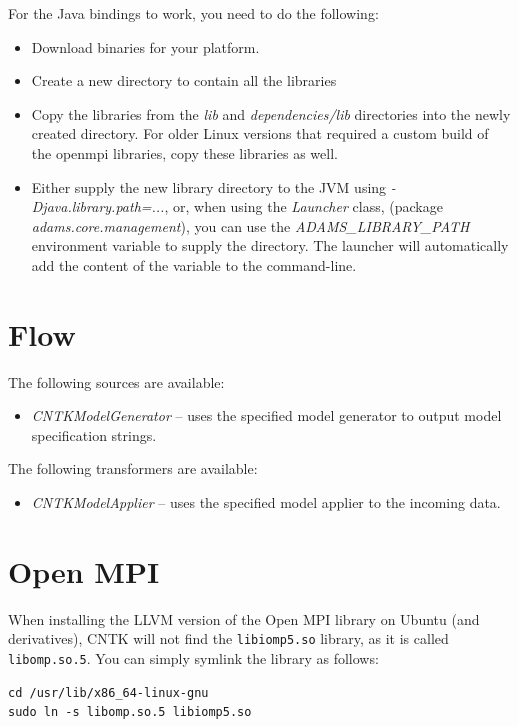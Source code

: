 \documentclass[a4paper]{book}
\begin{document}
\noindent For the Java bindings to work, you need to do the following:
\begin{itemize}
  \item Download binaries for your platform.
  \item Create a new directory to contain all the libraries
  \item Copy the libraries from the \textit{lib} and \textit{dependencies/lib}
  directories into the newly created directory. For older Linux versions that
  required a custom build of the openmpi libraries, copy these libraries as well.
  \item Either supply the new library directory to the JVM using
  \textit{-Djava.library.path=...}, or, when using the \textit{Launcher} class,
  (package \textit{adams.core.management}), you can use the
  \textit{ADAMS\_LIBRARY\_PATH} environment variable to supply the directory.
  The launcher will automatically add the content of the variable to the
  command-line.
\end{itemize}


\chapter{Flow}
The following sources are available:
\begin{itemize}
  \item \textit{CNTKModelGenerator} -- uses the specified model generator
  to output model specification strings.
\end{itemize}
The following transformers are available:
\begin{itemize}
  \item \textit{CNTKModelApplier} -- uses the specified model applier to the
  incoming data.
\end{itemize}

\chapter{Open MPI}

When installing the LLVM version of the Open MPI library on Ubuntu (and
derivatives), CNTK will not find the \texttt{libiomp5.so} library, as it
is called \texttt{libomp.so.5}. You can simply symlink the library as
follows:
\begin{verbatim}
cd /usr/lib/x86_64-linux-gnu
sudo ln -s libomp.so.5 libiomp5.so
\end{verbatim}
\end{document}
